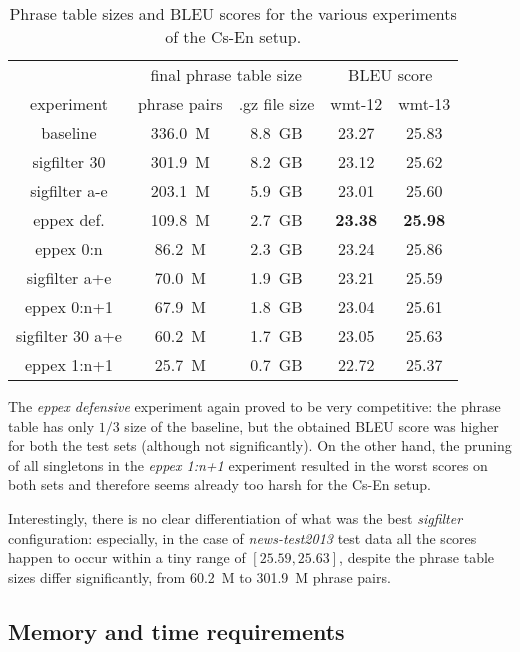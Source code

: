 \begin{table}[ht]
\centering
\begin{tabular}{ | c | c c | c c | }
\hline
 & \multicolumn{2}{|c|}{final phrase table size} & \multicolumn{2}{|c|}{BLEU score} \\
experiment & phrase pairs & .gz file size & wmt-12 & wmt-13 \\
\hline
\hline
baseline          & 336.0~M & 8.8~GB & 23.27 & 25.83 \\
sigfilter 30      & 301.9~M & 8.2~GB & 23.12 & 25.62 \\
sigfilter a-e     & 203.1~M & 5.9~GB & 23.01 & 25.60 \\
eppex def.        & 109.8~M & 2.7~GB & \textbf{23.38} & \textbf{25.98} \\
eppex 0:n         &  86.2~M & 2.3~GB & 23.24 & 25.86 \\
sigfilter a+e     &  70.0~M & 1.9~GB & 23.21 & 25.59 \\
eppex 0:n+1       &  67.9~M & 1.8~GB & 23.04 & 25.61 \\
sigfilter 30 a+e  &  60.2~M & 1.7~GB & 23.05 & 25.63 \\
eppex 1:n+1       &  25.7~M & 0.7~GB & 22.72 & 25.37 \\
\hline
\end{tabular}
\caption{\label{cs-en-wmt13-pt-size-and-bleu}
Phrase table sizes and BLEU scores for the various experiments of the Cs-En setup.}
\end{table}

The \emph{eppex defensive} experiment again proved to be very competitive:
the phrase table has only $1/3$ size of the baseline,
but the obtained BLEU score was higher for both the test sets (although not significantly).
On the other hand, the pruning of all singletons in the \emph{eppex 1:n+1} experiment
resulted in the worst scores on both sets and therefore seems already too harsh for
the Cs-En setup.

Interestingly, there is no clear differentiation of what was the best \emph{sigfilter}
configuration: especially, in the case of \emph{news-test2013} test data all the scores
happen to occur within a tiny range of $[25.59, 25.63]$, despite the phrase table sizes
differ significantly, from 60.2~M to 301.9~M phrase pairs.

\subsection{Memory and time requirements}

